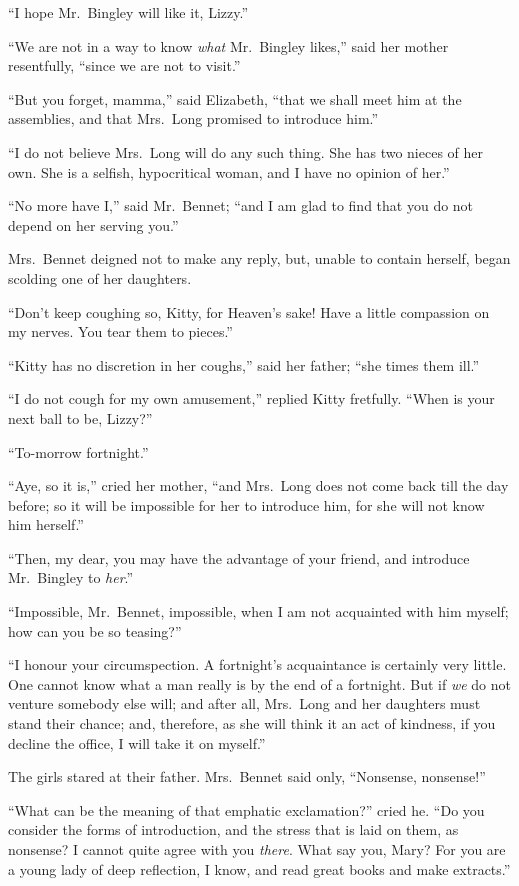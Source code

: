``I hope Mr.\ Bingley will like it, Lizzy.''

``We are not in a way to know \emph{what} Mr.\ Bingley likes,'' said
her mother resentfully, ``since we are not to visit.''

``But you forget, mamma,'' said Elizabeth, ``that we shall meet
him at the assemblies, and that Mrs.\ Long promised to introduce
him.''

``I do not believe Mrs.\ Long will do any such thing.  She has two
nieces of her own.  She is a selfish, hypocritical woman, and I
have no opinion of her.''

``No more have I,'' said Mr.\ Bennet; ``and I am glad to find that
you do not depend on her serving you.''

Mrs.\ Bennet deigned not to make any reply, but, unable to
contain herself, began scolding one of her daughters.

``Don't keep coughing so, Kitty, for Heaven's sake!  Have a little
compassion on my nerves.  You tear them to pieces.''

``Kitty has no discretion in her coughs,'' said her father; ``she
times them ill.''

``I do not cough for my own amusement,'' replied Kitty fretfully.
``When is your next ball to be, Lizzy?''

``To-morrow fortnight.''

``Aye, so it is,'' cried her mother, ``and Mrs.\ Long does not come
back till the day before; so it will be impossible for her to
introduce him, for she will not know him herself.''

``Then, my dear, you may have the advantage of your friend, and
introduce Mr.\ Bingley to \emph{her}.''

``Impossible, Mr.\ Bennet, impossible, when I am not acquainted
with him myself; how can you be so teasing?''

``I honour your circumspection.  A fortnight's acquaintance is
certainly very little.  One cannot know what a man really is by
the end of a fortnight.  But if \emph{we} do not venture somebody else
will; and after all, Mrs.\ Long and her daughters must stand their
chance; and, therefore, as she will think it an act of kindness,
if you decline the office, I will take it on myself.''

The girls stared at their father.  Mrs.\ Bennet said only,
``Nonsense, nonsense!''

``What can be the meaning of that emphatic exclamation?'' cried
he.  ``Do you consider the forms of introduction, and the stress
that is laid on them, as nonsense?  I cannot quite agree with
you \emph{there}.  What say you, Mary?  For you are a young lady of
deep reflection, I know, and read great books and make extracts.''

